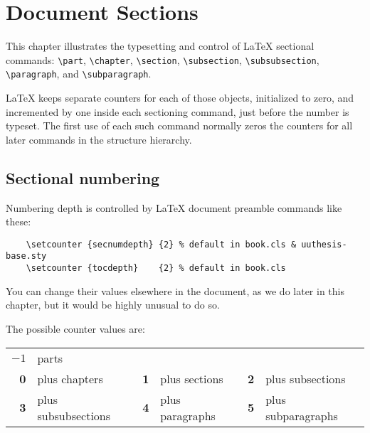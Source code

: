 
\chapter{Document Sections}

This chapter illustrates the typesetting and control of \LaTeX{}
sectional commands: 
    \verb=\part=,
    \verb=\chapter=,
    \verb=\section=,
    \verb=\subsection=,
    \verb=\subsubsection=,
    \verb=\paragraph=,
    and
    \verb=\subparagraph=.

\LaTeX{} keeps separate counters for each of those objects,
initialized to zero, and incremented by one inside each sectioning
command, just before the number is typeset.  The first use of each
such command normally zeros the counters for all later commands in the
structure hierarchy.

\section{Sectional numbering}

Numbering depth is controlled by \LaTeX{} document preamble commands
like these:
%
\begin{verbatim}
    \setcounter {secnumdepth} {2} % default in book.cls & uuthesis-base.sty
    \setcounter {tocdepth}    {2} % default in book.cls
\end{verbatim}
%
You can change their values elsewhere in the document, as we do later
in this chapter, but it would be highly unusual to do so.

The possible counter values are:
%
\begin{center}
    \begin{tabular}{rlrlrl}
      \boldmath
      \bf $-1$ & parts               \\
      \bf 0    & plus chapters       &
      \bf 1    & plus sections       &
      \bf 2    & plus subsections    \\
      \bf 3    & plus subsubsections &
      \bf 4    & plus paragraphs     &
      \bf 5    & plus subparagraphs
    \end{tabular}
\end{center}

